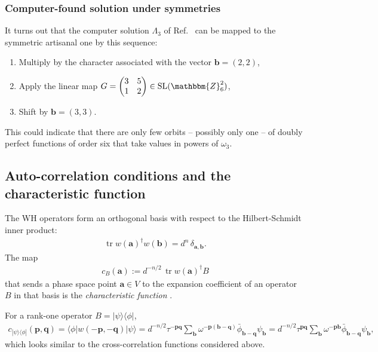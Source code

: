 \documentclass[aps,nofootinbib,floatfix,a4paper]{revtex4}
\newcommand{\1}{\mbox{$\mathbf{1}$}}
\def\ZZ{\mathbbm{Z}}
\DeclareMathOperator{\SL}{SL}
\DeclareMathOperator{\tr}{tr}
\renewcommand{\vec}{\mathbf}
\begin{document}
\subsubsection{Computer-found solution under symmetries}

It turns out that the computer solution $\Lambda_3$ of Ref.~\cite{Rather2024Construction} can be mapped to the symmetric artisanal one by this sequence: %
\begin{enumerate}
	\item
		Multiply by the character associated with the vector $\vec b=(2,2)$,
	\item
		Apply the linear map 
		$
			G=
			\begin{pmatrix}
				3 & 5 \\
				1 & 2
			\end{pmatrix}
			\in 
			\SL(\ZZ_6^2)
		$,
	\item
		Shift by $\vec b=(3,3)$.
\end{enumerate}
This could indicate that there are only few orbits -- possibly only one -- of doubly perfect functions of order six that take values in powers of $\omega_3$.


\subsection{Auto-correlation conditions and the characteristic function}
\label{sec:characteristic}

The WH operators form an orthogonal basis with respect to the Hilbert-Schmidt inner product:
\begin{align*}
	\tr w(\vec a)^\dagger w(\vec b) = d^n\,\delta_{\vec a, \vec b}.
\end{align*}
The map 
\begin{align*}
	c_B(\vec a) := d^{-n/2} \, \tr w(\vec a)^\dagger B
\end{align*}
that sends a phase space point $\vec a\in V$ to the expansion coefficient of an operator $B$ in that basis is the \emph{characteristic function} \cite{gross2006hudson}.

For a rank-one operator $B=|\psi\rangle\langle\phi|$,
\begin{align*}
	c_{|\psi\rangle\langle\phi|}(\vec p, \vec q)
	=
	\langle\phi|w(-\vec p, -\vec q) |\psi\rangle
	=
	d^{-n/2}
	\tau^{-\vec p \vec q}
	\sum_{\vec b}
	\omega^{-\vec p(\vec b-\vec q) }
	\bar\phi_{\vec b - \vec q}
	\psi_{\vec b}
	=
	d^{-n/2}
	\tau^{\vec p \vec q}
	\sum_{\vec b}
	\omega^{-\vec p \vec b }
	\bar\phi_{\vec b - \vec q}
	\psi_{\vec b},
\end{align*}
which looks similar to the cross-correlation functions considered above.
\end{document}
